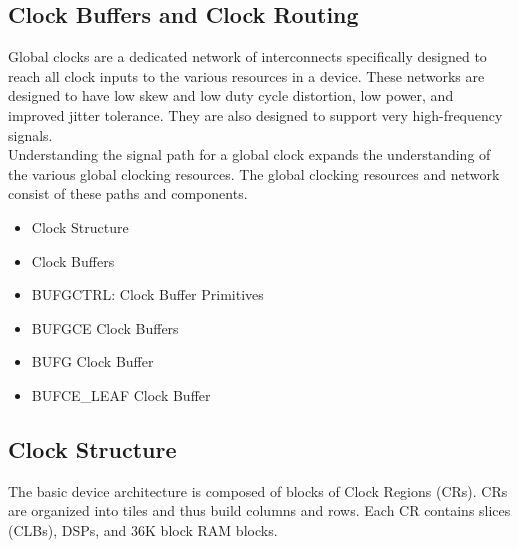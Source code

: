 \documentclass[12pt, a4paper]{report}
\begin{document}
    \subsection{Clock Buffers and Clock Routing}
    Global clocks are a dedicated network of interconnects specifically designed to reach all clock inputs to the various resources in a device. These networks are designed to have low skew and low duty cycle distortion, low power, and improved jitter tolerance. They are also designed to support very high-frequency signals.\\ 
    Understanding the signal path for a global clock expands the understanding of the various global clocking resources. The global clocking resources and network consist of these paths
    and components.
    \begin{itemize}
        \item Clock Structure
        \item Clock Buffers
        \item BUFGCTRL: Clock Buffer Primitives
        \item BUFGCE Clock Buffers
        \item BUFG Clock Buffer
        \item BUFCE\_LEAF Clock Buffer
    \end{itemize}

    \subsection{Clock Structure}
    The basic device architecture is composed of blocks of Clock Regions (CRs). CRs are organized into tiles and thus build columns and rows. Each CR contains slices (CLBs), DSPs, and 36K block RAM blocks.
    
\end{document}
